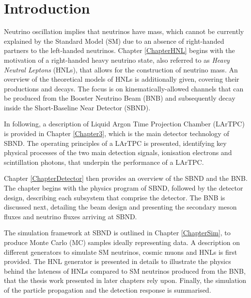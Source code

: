 
\chapter{Introduction}  %

Neutrino oscillation implies that neutrinos have mass, which cannot be currently explained by the Standard Model (SM) due to an absence of right-handed partners to the left-handed neutrinos.  
Chapter \ref{ChapterHNL}  begins with the motivation of a right-handed heavy neutrino state, also referred to as \textit{Heavy Neutral Leptons} (HNLs), that allows for the construction of neutrino mass.
An overview of the theoretical models of HNLs is additionally given, covering their productions and decays.
The focus is on kinematically-allowed channels that can be produced from the Booster Neutrino Beam (BNB) and subsequently decay inside the Short-Baseline Near Detector (SBND).

In following, a description of Liquid Argon Time Projection Chamber (LArTPC) is provided in Chapter \ref{Chapter3}, which is the main detector technology of SBND.
The operating principles of a LArTPC is presented, identifying key physical processes of the two main detection signals, ionisation electrons and scintillation photons, that underpin the performance of a LArTPC.

Chapter \ref{ChapterDetector} then provides an overview of the SBND and the BNB. 
The chapter begins with the physics program of SBND, followed by the detector design, describing each subsystem that comprise the detector.
The BNB is discussed next, detailing the beam design and presenting the secondary meson fluxes and neutrino fluxes arriving at SBND.   

The simulation framework at SBND is outlined in Chapter \ref{ChapterSim}, to produce Monte Carlo (MC) samples ideally representing data.
A description on different generators to simulate SM neutrinos, cosmic muons and HNLs is first provided.
The HNL generator is presented in details to illustrate the physics behind the lateness of HNLs compared to SM neutrinos produced from the BNB, that the thesis work presented in later chapters rely upon.  
Finally, the simulation of the particle propagation and the detection response is summarised.

